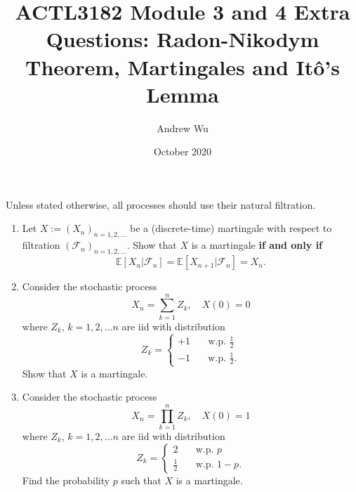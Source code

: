 \documentclass[11pt]{article}
\title{\textbf{ACTL3182 Module 3 and 4 Extra Questions: Radon-Nikodym Theorem, Martingales and It\^o's Lemma}}
\author{Andrew Wu}
\date{October 2020}
\newcommand{\E}{\mathbb{E}}
\begin{document}
	\maketitle
	Unless stated otherwise, all processes should use their natural filtration.
	\begin{enumerate}
		\item Let \( X:=(X_n)_{n=1,2,\ldots} \) be a (discrete-time) martingale with respect to filtration \( (\mathcal{F}_n)_{n=1,2,\ldots} \). Show that \( X \) is a martingale \textbf{if and only if} 
		\[
			\E[X_n |\mathcal{F}_n] = \E[X_{n+1}|\mathcal{F}_n] = X_n.
			\]
		\item Consider the stochastic process 
		\[	X_n = \sum_{k=1}^{n}Z_{k},\quad X(0) = 0
		\]
		where $Z_{k}$, $k=1,2,...n$ are iid with distribution 
		\[	Z_{k} = \begin{cases}
			+1 &  \quad \text{w.p. } \frac{1}{2} \\
			-1 & \quad \text{w.p. } \frac{1}{2}.
		\end{cases}
		\]
		Show that \( X \) is a martingale.
		\item Consider the stochastic process 
		\[
			X_n = \prod_{k=1}^{n}Z_{k},\quad X(0) = 1
			\]
		where $Z_{k}$, $k=1,2,...n$ are iid with distribution 
		\[	Z_{k} = \begin{cases}
			2 &  \quad \text{w.p. } p \\
			\frac{1}{2} & \quad \text{w.p. } 1-p.
		\end{cases}
		\]
		Find the probability \( p \) such that \( X \) is a martingale.
		

\end{enumerate}
\end{document}
